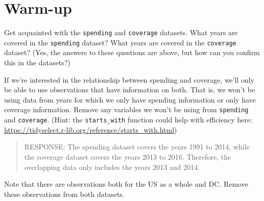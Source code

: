 \documentclass[
]{article}
\newenvironment{Shaded}{\begin{snugshade}}{\end{snugshade}}
\newcommand{\AttributeTok}[1]{\textcolor[rgb]{0.77,0.63,0.00}{#1}}
\newcommand{\CommentTok}[1]{\textcolor[rgb]{0.56,0.35,0.01}{\textit{#1}}}
\newcommand{\ConstantTok}[1]{\textcolor[rgb]{0.00,0.00,0.00}{#1}}
\newcommand{\FunctionTok}[1]{\textcolor[rgb]{0.00,0.00,0.00}{#1}}
\newcommand{\NormalTok}[1]{#1}
\newcommand{\OtherTok}[1]{\textcolor[rgb]{0.56,0.35,0.01}{#1}}
\newcommand{\SpecialCharTok}[1]{\textcolor[rgb]{0.00,0.00,0.00}{#1}}
\newcommand{\StringTok}[1]{\textcolor[rgb]{0.31,0.60,0.02}{#1}}
\begin{document}
\hypertarget{warm-up}{%
\section{Warm-up}\label{warm-up}}

Get acquainted with the \texttt{spending} and \texttt{coverage}
datasets. What years are covered in the \texttt{spending} dataset? What
years are covered in the \texttt{coverage} dataset? (Yes, the answers to
these questions are above, but how can you confirm this in the
datasets?)

If we're interested in the relationship between spending and coverage,
we'll only be able to use observations that have information on both.
That is, we won't be using data from years for which we only have
spending information or only have coverage information. Remove any
variables we won't be using from \texttt{spending} and
\texttt{coverage}. (Hint: the \texttt{starts\_with} function could help
with efficiency here:
\url{https://tidyselect.r-lib.org/reference/starts_with.html})

\begin{quote}
RESPONSE: The spending dataset covers the years 1991 to 2014, while the
coverage dataset covers the years 2013 to 2016. Therefore, the
overlapping data only includes the years 2013 and 2014.
\end{quote}

\begin{Shaded}
\end{Shaded}

Note that there are observations both for the US as a whole and DC.
Remove these observations from both datasets.
\end{document}
